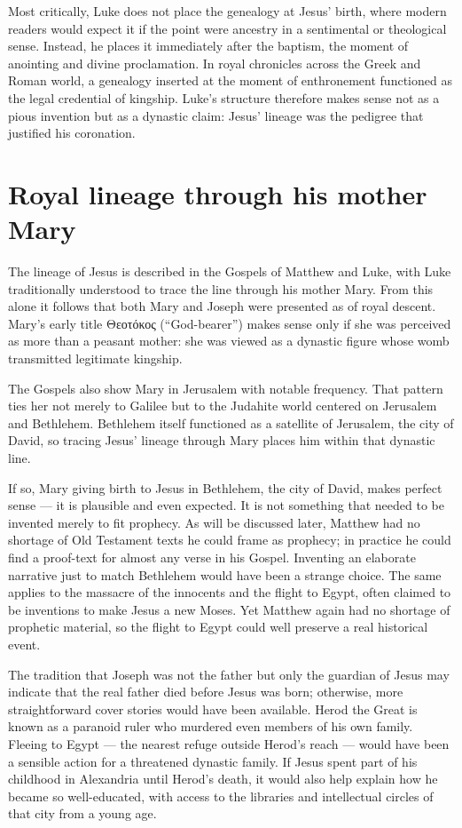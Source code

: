 Most critically, Luke does not place the genealogy at Jesus’ birth, where modern readers would expect it if the point were ancestry in a sentimental or theological sense.
Instead, he places it immediately after the baptism, the moment of anointing and divine proclamation.
In royal chronicles across the Greek and Roman world, a genealogy inserted at the moment of enthronement functioned as the legal credential of kingship.
Luke’s structure therefore makes sense not as a pious invention but as a dynastic claim: Jesus’ lineage was the pedigree that justified his coronation.

\section{Royal lineage through his mother Mary}\label{sec:royal-lineage-through-his-mother-mary}

The lineage of Jesus is described in the Gospels of Matthew and Luke, with Luke traditionally understood to trace the line through his mother Mary.
From this alone it follows that both Mary and Joseph were presented as of royal descent.
Mary’s early title Θεοτόκος (“God-bearer”) makes sense only if she was perceived as more than a peasant mother: she was viewed as a dynastic figure whose womb transmitted legitimate kingship.

The Gospels also show Mary in Jerusalem with notable frequency.
That pattern ties her not merely to Galilee but to the Judahite world centered on Jerusalem and Bethlehem.
Bethlehem itself functioned as a satellite of Jerusalem, the city of David, so tracing Jesus’ lineage through Mary places him within that dynastic line.

If so, Mary giving birth to Jesus in Bethlehem, the city of David, makes perfect sense — it is plausible and even expected.
It is not something that needed to be invented merely to fit prophecy.
As will be discussed later, Matthew had no shortage of Old Testament texts he could frame as prophecy; in practice he could find a proof-text for almost any verse in his Gospel.
Inventing an elaborate narrative just to match Bethlehem would have been a strange choice.
The same applies to the massacre of the innocents and the flight to Egypt, often claimed to be inventions to make Jesus a new Moses.
Yet Matthew again had no shortage of prophetic material, so the flight to Egypt could well preserve a real historical event.

The tradition that Joseph was not the father but only the guardian of Jesus may indicate that the real father died before Jesus was born; otherwise, more straightforward cover stories would have been available.
Herod the Great is known as a paranoid ruler who murdered even members of his own family.
Fleeing to Egypt — the nearest refuge outside Herod’s reach — would have been a sensible action for a threatened dynastic family.
If Jesus spent part of his childhood in Alexandria until Herod’s death, it would also help explain how he became so well-educated, with access to the libraries and intellectual circles of that city from a young age.


